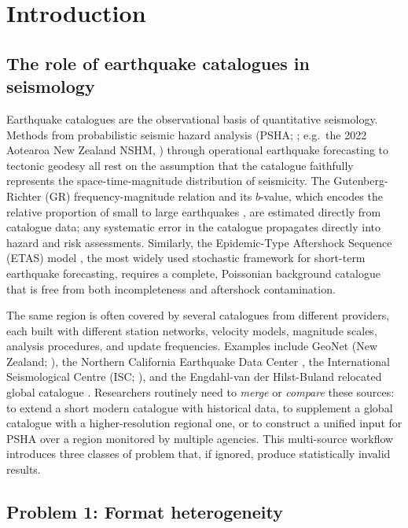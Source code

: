 \documentclass[12pt]{article}
\begin{document}
\section{Introduction}
\label{sec:intro}

\subsection{The role of earthquake catalogues in seismology}

Earthquake catalogues are the observational basis of quantitative
seismology.  Methods from probabilistic seismic hazard analysis (PSHA;
\citealt{cornell1968}; e.g.\ the 2022 Aotearoa New Zealand NSHM,
\citealt{gerstenberger2024}) through operational earthquake forecasting
\citep{schorlemmer2007} to tectonic geodesy all rest on the assumption that the
catalogue faithfully represents the space-time-magnitude distribution of
seismicity.  The
Gutenberg-Richter (GR) frequency-magnitude relation \citep{gutenberg1944}
and its $b$-value, which encodes the relative proportion of small to large
earthquakes \citep{kagan1999,schorlemmer2005}, are estimated directly from
catalogue data; any systematic error in the catalogue propagates directly
into hazard and risk assessments.  Similarly, the Epidemic-Type Aftershock
Sequence (ETAS) model \citep{ogata1988}, the most widely used stochastic
framework for short-term earthquake forecasting, requires a complete,
Poissonian background catalogue that is free from both incompleteness and
aftershock contamination.

The same region is often covered by several catalogues from different
providers, each built with different station networks, velocity models,
magnitude scales, analysis procedures, and update frequencies.  Examples include
GeoNet (New Zealand; \citealt{petersen2011}), the Northern California Earthquake
Data Center \citep{ncedc2014}, the International Seismological Centre (ISC;
\citealt{storchak2013}), and the Engdahl-van der Hilst-Buland relocated global
catalogue \citep{engdahl1998}.  Researchers routinely need to
\emph{merge} or \emph{compare} these sources: to extend a short modern
catalogue with historical data, to supplement a global catalogue with a
higher-resolution regional one, or to construct a unified input for PSHA
over a region monitored by multiple agencies.  This multi-source workflow
introduces three classes of problem that, if ignored, produce statistically
invalid results.

\subsection{Problem 1: Format heterogeneity}
\end{document}
